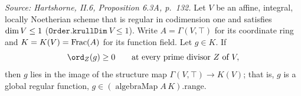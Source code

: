 \begin{theorem}
  \label{thm:chart_mem_range_of_forall_order_nonneg}
  \textit{Source: Hartshorne, II.6, Proposition 6.3A, p.~132.}
  Let \(V\) be an affine, integral, locally Noetherian scheme that is regular in
  codimension one and satisfies \(\dim V \le 1\) (\(\texttt{Order.krullDim}\
  V \le 1\)). Write \(A = \Gamma(V, \top)\) for its coordinate ring and
  \(K = K(V) = \operatorname{Frac}(A)\) for its function field. Let \(g \in K\). If
  \[
    \ord_Z(g) \ge 0 \qquad \text{at every prime divisor } Z \text{ of } V,
  \]
  then \(g\) lies in the image of the structure map
  \(\Gamma(V, \top) \to K(V)\); that is, \(g\) is a global regular function,
  \(g \in (\operatorname{algebraMap} A\,K).\mathrm{range}\).
\end{theorem}

